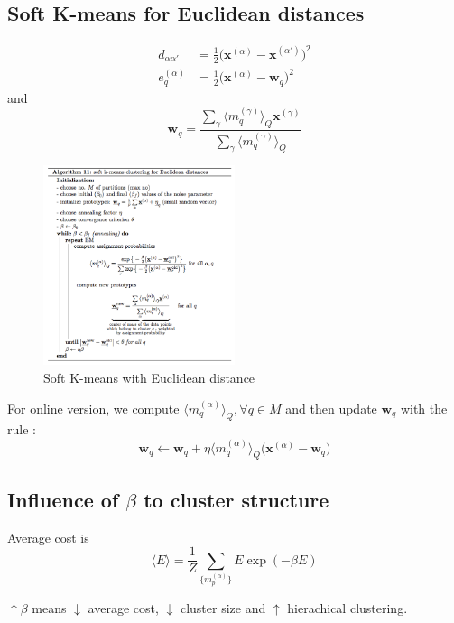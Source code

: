\subsection{Soft K-means for Euclidean distances}


\begin{align*}
	d_{\alpha\alpha'} &= \frac{1}{2}\bigg(  \boldsymbol{x}^{(\alpha)}  -  \boldsymbol{x}^{(\alpha')} \bigg)^2 \\
	e_q^{(\alpha)} &= \frac{1}{2}\bigg(  \boldsymbol{x}^{(\alpha)}  -  \boldsymbol{w}_q \bigg)^2
\end{align*}
and 
$$
\boldsymbol{w}_q = \frac{ \sum_\gamma \langle m_q^{(\gamma)} \rangle_Q \boldsymbol{x}^{(\gamma)} }{ \sum_\gamma \langle m_q^{(\gamma)} \rangle_Q }
$$

\begin{figure}[hbt]
	\center
  \includegraphics[width=0.5\textwidth]{figures/cl-soft-k-mean-eucli}
  \caption{Soft K-means with Euclidean distance}
\end{figure}

For online version, we compute $\langle m_q^{(\alpha)} \rangle_Q , \forall q \in M $ and then update $\boldsymbol{w}_q $ with the rule :
$$
\boldsymbol{w}_q \leftarrow \boldsymbol{w}_q + \eta \langle m_q^{(\alpha)} \rangle_Q \bigg( \boldsymbol{x}^{(\alpha)} -  \boldsymbol{w}_q \bigg) 
$$

\subsection{Influence of $\beta$ to cluster structure}

Average cost is 
$$
\langle E \rangle = \frac{1}{Z} \sum_{ \{ m_p^{(\alpha)} \} } E\exp{ ( -\beta E ) }
$$

$\uparrow \beta$ means $\downarrow $ average cost,  $\downarrow $ cluster size and $\uparrow$ hierachical clustering.

